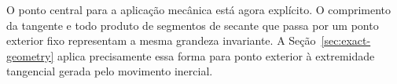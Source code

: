 \documentclass[12pt,a4paper]{article}
\numberwithin{equation}{section}
\theoremstyle{remark}
\begin{document}
O ponto central para a aplicação mecânica está agora explícito. O comprimento da tangente e todo produto de segmentos de secante que passa por um ponto exterior fixo representam a mesma grandeza invariante. A Seção~\ref{sec:exact-geometry} aplica precisamente essa forma para ponto exterior à extremidade tangencial gerada pelo movimento inercial.
\end{document}
